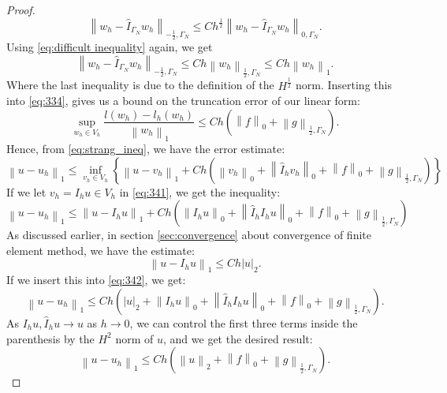 \documentclass[../Main/main.tex]{subfiles}
\begin{document}
\begin{proof}
		\begin{equation}
				\left \|w_h-\hat{I}_{\Gamma_N} w_h\right \|_{-\frac{1}{2},\Gamma_N} \leq Ch^{\frac{1}{2}} \left \| w_h-\hat{I}_{\Gamma_N} w_h \right \|_{0,\Gamma_N}.
		\end{equation}
		Using \eqref{eq:difficult inequality} again, we get
		\begin{equation}
				\left \|w_h-\hat{I}_{\Gamma_N} w_h\right \|_{-\frac{1}{2},\Gamma_N} \leq Ch \left \|w_h\right \|_{\frac{1}{2},\Gamma_N} \leq Ch\left \| w_h \right \|_1.
		\end{equation}
		Where the last inequality is due to the definition of the $H^{\frac{1}{2}}$ norm. Inserting this into \eqref{eq:334}, gives us a bound on the truncation error of our linear form:
		\begin{equation}
			\sup_{w_h \in V_h} \frac{l(w_h)-l_h(w_h)}{\left \| w_h \right \|_1} \leq Ch(\left \|f \right \|_0 + \left \| g \right \|_{\frac{1}{2},\Gamma_N}).
		\end{equation}
		Hence, from \eqref{eq:strang_ineq}, we have the error estimate:
		\begin{equation}\label{eq:341}
					\left \| u - u_h \right \|_1 \leq \inf_{v_h \in V_h}\left \{ \left \| u - v_h \right \|_1 + Ch \left (\left \| v_h\right \|_0 + \left \| \hat{I}_h v_h \right \|_0 + \left \| f \right \|_0 + \left \| g \right \|_{\frac{1}{2},\Gamma_N}\right ) \right \}
		\end{equation}
	If we let $v_h = I_h u \in V_h$ in \eqref{eq:341}, we get the inequality:
	\begin{equation}\label{eq:342}
	\left \| u - u_h \right \|_1 \leq \left \| u - I_h u \right \|_1 + Ch \left (\left \| I_h u\right \|_0 + \left \| \hat{I}_h I_h u \right \|_0 + \left \| f \right \|_0 + \left \| g \right \|_{\frac{1}{2},\Gamma_N} \right )
	\end{equation}
	As discussed earlier, in section \ref{sec:convergence} about convergence of finite element method, we have the estimate:
	\begin{equation}
 \left \| u - I_h u \right \|_1 \leq C h|u|_2.
	\end{equation}
	If we insert this into \eqref{eq:342}, we get:
	\begin{equation}
	\left \| u - u_h \right \|_1 \leq  Ch \left ( |u|_2 + \left \| I_h u\right \|_0 + \left \| \hat{I}_h I_h u \right \|_0 + \left \| f \right \|_0 + \left \| g \right \|_{\frac{1}{2},\Gamma_N} \right ).
	\end{equation}
	As $I_h u, \hat{I}_h u \rightarrow u$ as $h\rightarrow 0$, we can control the first three terms inside the parenthesis by the $H^2$ norm of $u$, and we get the desired result:
	\begin{equation}
\left \| u - u_h \right \|_1 \leq  Ch \left ( \left \|u\right \|_2 + \left \| f \right \|_0 + \left \| g \right \|_{\frac{1}{2},\Gamma_N} \right ).	\end{equation}
	\end{proof}
\end{document}
